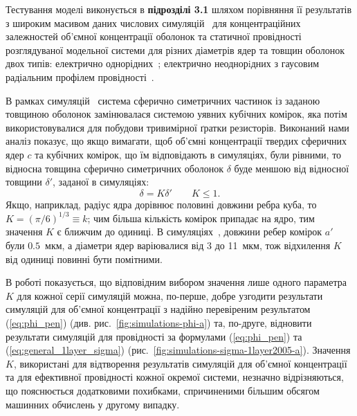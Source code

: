 \documentclass[twoside,a4paper,14pt]{vakaref}
\begin{document}
Тестування моделі виконується в {\bf підрозділі 3.1} шляхом порівняння її результатів з широким масивом даних числових симуляцій~\cite{Siekierski2005, Siekierski2006, Siekierski2007} для концентраційних залежностей об'ємної концентрації оболонок та статичної провідності розглядуваної модельної системи для різних діаметрів ядер та товщин оболонок двох типів: електрично однорідних~\cite{Siekierski2005, Siekierski2007}; електрично неоднорiдних з гаусовим радіальним профілем провідності~\cite{Siekierski2006}.

В рамках симуляцій~\cite{Siekierski2005, Siekierski2006, Siekierski2007} система сферично симетричних частинок із заданою товщиною оболонок замінювалася системою уявних кубічних комірок, яка потім використовувалися для побудови тривимірної ґратки резисторів. Виконаний нами аналіз показує, що якщо вимагати, щоб об'ємні концентрації твердих сферичних ядер $c$ та кубічних комірок, що їм відповідають в симуляціях, були рівними, то відносна товщина сферично симетричних оболонок $\delta$ буде меншою від відносної товщини $\delta'$, заданої в симуляціях:
\begin{equation}\label{eq:K-delta-def}
\delta = K \delta' \qquad K \leq 1.
\end{equation}
Якщо, наприклад, радіус ядра дорівнює половині довжини ребра куба, то $K=(\pi/6)^{1/3}\equiv k$; чим більша кількість комірок припадає на ядро, тим значення $K$ є ближчим до одиниці. 
В симуляціях~\cite{Siekierski2005, Siekierski2006, Siekierski2007}, довжини ребер комірок $a'$ були $0.5$~мкм, а діаметри ядер варіювалися від 3 до 11~мкм, тож відхилення $K$ від одиниці повинні бути помітними. 

В роботі  показується, що  відповідним вибором значення лише одного параметра $K$  для кожної серії симуляцій можна, по-перше, добре узгодити результати симуляцій для об'ємної концентрації з надійно перевіреним результатом (\ref{eq:phi_pen}) (див. рис.~\ref{fig:simulations-phi-a}) та, по-друге, відновити результати симуляцій для провідності за формулами (\ref{eq:phi_pen}) та (\ref{eq:general_1layer_sigma})  (рис.~\ref{fig:simulations-sigma-1layer2005-a}).
Значення $K$, використані для відтворення результатів  симуляцій для об'ємної концентрації та для ефективної провідності кожної окремої системи, незначно відрізняються, що пояснюється додатковими похибками, спричиненими більшим обсягом машинних обчислень у другому випадку.
\end{document}
